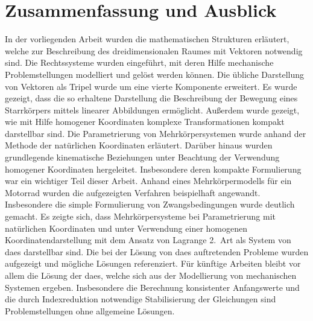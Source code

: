 \chapter{Zusammenfassung und Ausblick}
In der vorliegenden Arbeit wurden die mathematischen Strukturen erl\"autert, welche zur Beschreibung des dreidimensionalen Raumes mit Vektoren notwendig sind. Die Rechtssysteme wurden eingef\"uhrt, mit deren Hilfe mechanische Problemstellungen modelliert und gel\"ost werden k\"onnen. Die \"ubliche Darstellung von Vektoren als Tripel wurde um eine vierte Komponente erweitert. Es wurde gezeigt, dass die so erhaltene Darstellung die Beschreibung der Bewegung eines Starrk\"orpers mittels linearer Abbildungen erm\"oglicht. Au\ss{}erdem wurde gezeigt, wie mit Hilfe homogener Koordinaten komplexe Transformationen kompakt darstellbar sind. Die Parametrierung von Mehrk\"orpersystemen wurde anhand der Methode der nat\"urlichen Koordinaten erl\"autert. Dar\"uber hinaus wurden grundlegende kinematische Beziehungen unter Beachtung der Verwendung homogener Koordinaten hergeleitet. Insbesondere deren kompakte Formulierung war ein wichtiger Teil dieser Arbeit. Anhand eines Mehrk\"orpermodells f\"ur ein Motorrad wurden die aufgezeigten Verfahren beispielhaft angewandt. Insbesondere die simple Formulierung von Zwangsbedingungen wurde deutlich gemacht. Es zeigte sich, dass Mehrk\"orpersysteme bei Parametrierung mit nat\"urlichen Koordinaten und unter Verwendung einer homogenen Koordinatendarstellung mit dem Ansatz von Lagrange \mbox{2. Art} als System von \acp{dae} darstellbar sind. Die bei der L\"osung von \acp{dae} auftretenden Probleme wurden aufgezeigt und m\"ogliche L\"osungen referenziert. \hfill \newline
F\"ur k\"unftige Arbeiten bleibt vor allem die L\"osung der \acp{dae}, welche sich aus der Modellierung von mechanischen Systemen ergeben. Insbesondere die Berechnung konsistenter Anfangswerte und die durch Indexreduktion notwendige Stabilisierung der Gleichungen sind Problemstellungen ohne allgemeine L\"osungen.   